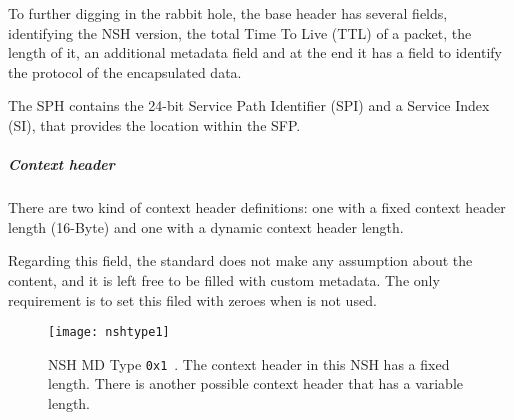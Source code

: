 To further digging in the rabbit hole, the base header has several fields,
identifying the NSH version, the total Time To Live (TTL) of a packet, the
length of it, an additional metadata field and at the end it has a field to
identify the protocol of the encapsulated data.

The SPH contains the 24-bit Service Path Identifier (SPI) and a Service Index
(SI), that provides the location within the SFP.

\subparagraph*{Context header}
There are two kind of context header definitions: one with a fixed context
header length (16-Byte) and one with a dynamic context header length.

\noindent Regarding this field, the standard does not make any assumption about
the content, and it is left free to be filled with custom metadata. The only
requirement is to set this filed with zeroes when is not used.

\begin{figure}[t]
  \centering
  \texttt{[image: nshtype1]}
  \caption[NSH MD Type \texttt{0x1}]{NSH MD Type \texttt{0x1}~\cite{rfc8300}.
    The context header in this NSH has a fixed length. There is another possible
    context header that has a variable length.}
  \label{chap:background:img:nshtype1}
\end{figure}
